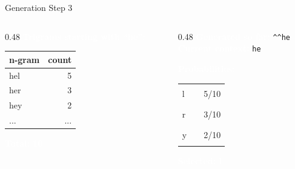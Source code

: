 \documentclass[aspectratio=169]{beamer}
\renewcommand{\textbf}[1]{\textcolor{white}{\bfseries #1}}
\begin{document}
\begin{frame}[c,fragile]{Generation Step 3}
\begin{columns}[c]
\begin{column}{0.48\textwidth}
\textbf{Trigrams starting with ``he'':}

\vspace{0.5em}
\begin{tabular}{|l|r|}
\hline
\rowcolor{codebg}
n-gram & count \\
\hline
hel & 5 \\
her & 3 \\
hey & 2 \\
... & ... \\
\hline
\end{tabular}

\vspace{0.5em}
\textbf{Total: 10}
\end{column}

\begin{column}{0.48\textwidth}
\textbf{Generated so far:} \texttt{\textasciicircum\textasciicircum he}\\
\textbf{Current context:} \texttt{he}

\vspace{0.5em}
\textbf{Probabilities:}

\begin{tabular}{@{}l@{ }l@{ }l@{}}
l & \textcolor{miamired}{\rule{3.0cm}{0.3cm}} & 5/10 \\
r & \textcolor{miamired}{\rule{1.8cm}{0.3cm}} & 3/10 \\
y & \textcolor{miamired}{\rule{1.2cm}{0.3cm}} & 2/10
\end{tabular}

\vspace{0.5em}
\textbf{Selected: l}
\end{column}
\end{columns}
\end{frame}
\end{document}
